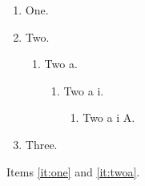 \documentclass{article}
\begin{document}
\begin{enumerate}
\item One.\label{it:one}
\item Two.
\begin{enumerate}
\item Two a.\label{it:twoa}
\begin{enumerate}
\item Two a i.
\begin{enumerate}
\item Two a i A.
\end{enumerate}
\end{enumerate}
\end{enumerate}
\item Three.
\end{enumerate}
Items \ref{it:one} and \ref{it:twoa}.
\end{document}
